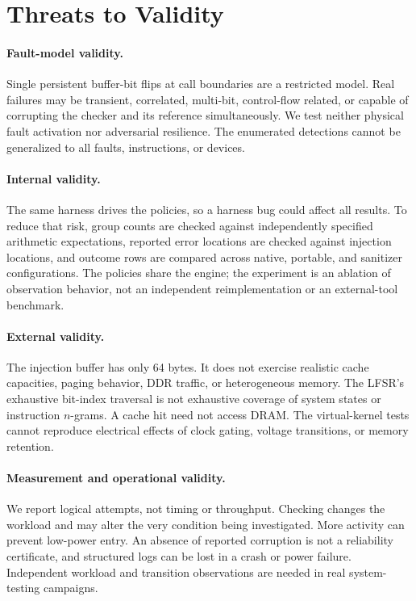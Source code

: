 \documentclass[10pt,twocolumn,letterpaper]{article}
\begin{document}
\section{Threats to Validity}
\paragraph{Fault-model validity.}
Single persistent buffer-bit flips at call boundaries are a restricted model. Real failures may be transient, correlated, multi-bit, control-flow related, or capable of corrupting the checker and its reference simultaneously. We test neither physical fault activation nor adversarial resilience. The enumerated detections cannot be generalized to all faults, instructions, or devices.

\paragraph{Internal validity.}
The same harness drives the policies, so a harness bug could affect all results. To reduce that risk, group counts are checked against independently specified arithmetic expectations, reported error locations are checked against injection locations, and outcome rows are compared across native, portable, and sanitizer configurations. The policies share the engine; the experiment is an ablation of observation behavior, not an independent reimplementation or an external-tool benchmark.

\paragraph{External validity.}
The injection buffer has only 64 bytes. It does not exercise realistic cache capacities, paging behavior, DDR traffic, or heterogeneous memory. The LFSR's exhaustive bit-index traversal is not exhaustive coverage of system states or instruction $n$-grams. A cache hit need not access DRAM. The virtual-kernel tests cannot reproduce electrical effects of clock gating, voltage transitions, or memory retention.

\paragraph{Measurement and operational validity.}
We report logical attempts, not timing or throughput. Checking changes the workload and may alter the very condition being investigated. More activity can prevent low-power entry. An absence of reported corruption is not a reliability certificate, and structured logs can be lost in a crash or power failure. Independent workload and transition observations are needed in real system-testing campaigns.
\end{document}
